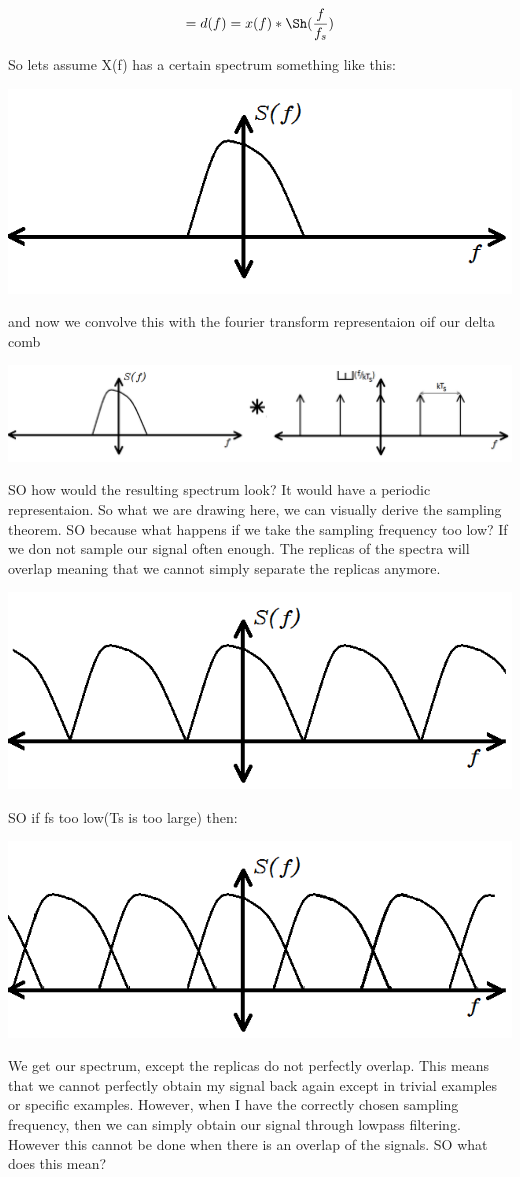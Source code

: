 \begin{equation*}=\uppercase{\discFunc}(f) = \uppercase{\contFunc}(f)*\Sh(\frac{f}{\samplingFreq}) \end{equation*}

So lets assume X(f) has a certain spectrum something like this:

\includegraphics[width=0.5\linewidth]{Pictures/Chapter_2_Lesson_1/Sampling3.png}

and now we convolve this with the fourier transform representaion oif our delta comb

\includegraphics[width=0.5\linewidth]{Pictures/Chapter_2_Lesson_1/Sampling7.png}

SO how would the resulting spectrum look? It would have a periodic representaion.  So what we are drawing here, we can visually derive the sampling theorem.  SO because what happens if we take the sampling frequency too low? If we don not sample our signal often enough.  The replicas of the spectra will overlap meaning that we cannot simply separate the replicas anymore.

\includegraphics[width=0.5\linewidth]{Pictures/Chapter_2_Lesson_1/Sampling8.png}

SO if fs too low(Ts is too large) then:

\includegraphics[width=0.5\linewidth]{Pictures/Chapter_2_Lesson_1/Sampling6.png}

 We get our spectrum, except the replicas do not perfectly overlap. This means that we cannot perfectly obtain my signal back again except in trivial examples or specific examples. However, when I have the correctly chosen sampling frequency, then we can simply obtain our signal through lowpass filtering. However this cannot be done when there is an overlap of the signals. SO what does this mean? 
 
